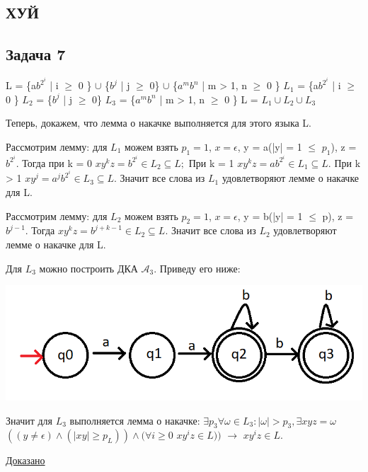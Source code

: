 \documentclass[a4paper,14pt]{article} %
\begin{document}
\subsection{ХУЙ}


\subsection{Задача 7}
L = \{a$b^{2^i}$ | i $\geqslant$ 0 \} $\cup$ \{$b^j$ | j $\geqslant$ 0\} $\cup$ \{$a^mb^n$ | m > 1, n $\geqslant$ 0 \}
\newline
$L_1$ = \{a$b^{2^i}$ | i $\geqslant$ 0 \}
\newline
$L_2$ = \{$b^j$ | j $\geqslant$ 0\} 
\newline
$L_3$ = \{$a^mb^n$ | m > 1, n $\geqslant$ 0 \}
\newline
L = $L_1 \cup L_2 \cup L_3$

Теперь, докажем, что лемма о накачке выполняется для этого языка L.

Рассмотрим лемму: для $L_1$ можем взять $p_1 = 1$, $x = \epsilon$, y = a(|y| = 1 $\leqslant$ $p_1$),
z = $b^{2^i}$. Тогда при k = 0 $xy^kz = b^{2^i} \in L_2 \subseteq L;$
При k = 1 $xy^kz = ab^{2^i} \in L_1 \subseteq L$.
При k > 1 $xy^j = a^jb^{2^i} \in L_3 \subseteq L$. Значит все слова из $L_1$ удовлетворяют лемме о накачке для L.

Рассмотрим лемму: для $L_2$ можем взять $p_2 = 1$, $x = \epsilon$, y = b(|y| = 1 $\leqslant$ p), z = $b^{j-1}$.
Тогда $xy^kz = b^{j+k-1} \in L_2 \subseteq L$. Значит все слова из $L_2$ удовлетворяют лемме о накачке для L.

Для $L_3$ можно построить ДКА $\mathcal{A}_3$. Приведу его ниже:

\includegraphics{02.png}

Значит для $L_3$ выполняется лемма о накачке: $\exists p_3 \forall \omega \in L_3 : |\omega| > p_3, \exists xyz = \omega$
$((y \neq \epsilon) \wedge (|xy| \geqslant p_L)) \wedge (\forall i \geqslant 0$ $xy^iz \in L))$ $\rightarrow$ $xy^iz \in L$.

\underline{Доказано}
\end{document}
